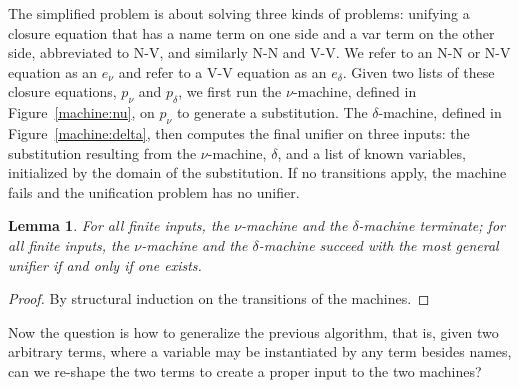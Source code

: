 \documentclass{easychair}
\newtheorem{lemm}{Lemma}[section]
\newcommand*{\transname}[1]{\textsc{#1}}
\begin{document}
The simplified problem is about solving three kinds of problems:
unifying a closure equation that has a name term on one side
and a var term on the other side,
abbreviated to \transname{N-V},
and similarly \transname{N-N} and \transname{V-V}.
We refer to an \transname{N-N} or \transname{N-V} equation as
an \emph{$e_\nu$} and refer to a
\transname{V-V} equation as an \emph{$e_\delta$}.
Given two lists of these closure equations,
$p_\nu$ and $p_\delta$,
we first run the
$\nu$-machine, defined in Figure~\ref{machine:nu},
on $p_\nu$ to generate a substitution.
The $\delta$-machine, defined in Figure~\ref{machine:delta},
then computes the final unifier on three inputs:
the substitution resulting from the $\nu$-machine,
$\delta$, and a list of known variables, initialized by
the domain of the substitution.
If no transitions apply, the machine
fails and the unification problem has no unifier.


\begin{lemm}\label{lemma:numachine}
 For all finite inputs, the $\nu$-machine and the $\delta$-machine terminate;
 for all finite inputs, the $\nu$-machine and the $\delta$-machine
 succeed with the most general unifier if and only if one exists.
\end{lemm}
\begin{proof}
By structural induction on the transitions of the machines.
\end{proof}


Now the question is how to generalize the previous algorithm, that is,
given two arbitrary terms, where a variable may be instantiated by any
term besides names, can we re-shape the two terms to create a proper
input to the two machines?
\end{document}
